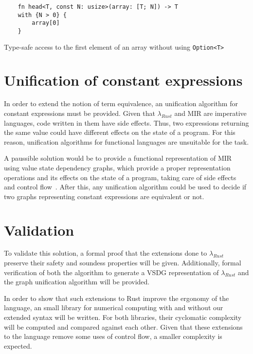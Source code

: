 \begin{listing}[ht]
	\begin{verbatim}
    fn head<T, const N: usize>(array: [T; N]) -> T
    with {N > 0} {
        array[0]
    }
    \end{verbatim}
    \caption{Type-safe access to the first element of an array without using
    \texttt{Option<T>}}
  \label{lst:head_const_generics}
\end{listing}

\section{Unification of constant expressions}

In order to extend the notion of term equivalence, an unification algorithm for
constant expressions must be provided. Given that $\lambda_{Rust}$ and MIR are
imperative languages, code written in them have side effects. Thus, two
expressions returning the same value could have different effects on the state
of a program. For this reason, unification algorithms for functional languages
are unsuitable for the task. 

A paussible solution would be to provide a functional representation of MIR
using value state dependency graphs, which provide a proper representation
operations and its effects on the state of a program, taking care of side
effects and control flow~\cite{vsdg}. After this, any unification algorithm
could be used to decide if two graphs representing constant expressions are
equivalent or not.

\section{Validation}

To validate this solution, a formal proof that the extensions done to
$\lambda_{Rust}$ preserve their safety and soundess properties will be given.
Additionally, formal verification of both the algorithm to generate a VSDG
representation of $\lambda_{Rust}$ and the graph unification algorithm will be
provided.

In order to show that such extensions to Rust improve the ergonomy of the
language, an small library for numerical computing with and without our extended
syntax will be written. For both libraries, their cyclomatic complexity will be
computed and compared against each other. Given that these extensions to the
language remove some uses of control flow, a smaller complexity is expected.
